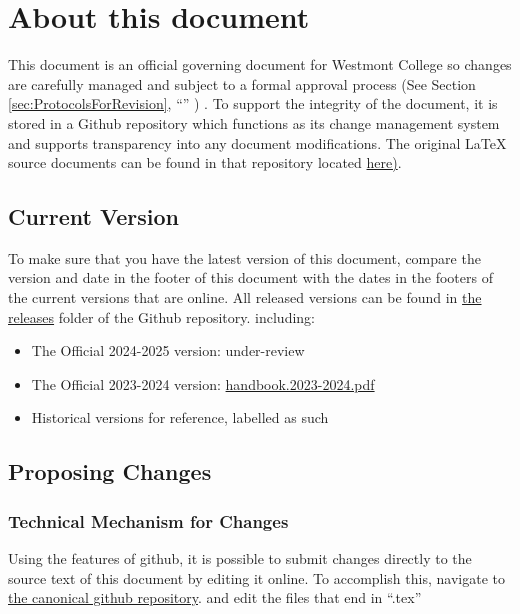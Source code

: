\section{About this document}
	\label{sec:AboutThisDocument}

	This document is an official governing document for Westmont College so changes are carefully managed and subject to a formal approval process
	(See Section
	\ref{sec:ProtocolsForRevision},
	``''
	) .
	To support the integrity of the document, it is stored in a Github repository which functions as its change management system and supports transparency into any document modifications.
	The original LaTeX source documents can be found in that repository located
	\href{https://github.com/djp3/WestmontFacultyHandbook}{here)}.



	\subsection{Current Version}


		To make sure that you have the latest version of this document, compare the version and date in the
		footer of this document with the dates in the footers of the current versions that are online.
		All released versions can be found in
		\href{https://github.com/jaron-burdick/WestmontFacultyHandbook/tree/Official-2023-2024-RC/releases}{the releases} folder of the Github repository.
		including:
		\begin{itemize}
			\item{The Official 2024-2025 version: under-review}
			\item{The Official 2023-2024 version: \href{https://github.com/djp3/WestmontFacultyHandbook/tree/Official-2023-2024-RC/releases}{handbook.2023-2024.pdf}}
			\item{Historical versions for reference, labelled as such}
		\end{itemize}

	\subsection{Proposing Changes}
		\subsubsection{Technical Mechanism for Changes}
			Using the features of github, it is possible to submit changes
			directly to the source text of this document by editing
			it online. To accomplish this,
			navigate to
			\href{https://github.com/djp3/WestmontFacultyHandbook}{the canonical github repository}.
			and
			edit the files that end in ``.tex''

